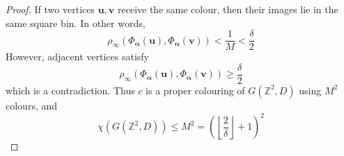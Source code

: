 \documentclass[10pt,a4paper]{amsart}
\newcommand{\Z}{\mathbb{Z}}
\newcommand{\floor}[1]{\left\lfloor#1\right\rfloor}
\begin{document}
\begin{proof}
If two vertices $\mathbf u,\mathbf v$ receive the same colour, then their images lie in the same square bin. In other words,
\[
\rho_\infty\!\left(
\Phi_{\boldsymbol\alpha}(\mathbf u),
\Phi_{\boldsymbol\alpha}(\mathbf v)
\right)
<
\frac1M
<
\frac{\delta}{2}
\]
However, adjacent vertices satisfy
\[
\rho_\infty\!\left(
\Phi_{\boldsymbol\alpha}(\mathbf u),
\Phi_{\boldsymbol\alpha}(\mathbf v)
\right)
\ge
\frac{\delta}{2}
\]
which is a contradiction.
Thus $c$ is a proper colouring of $G(\Z^2,D)$ using $M^2$ colours, and
\[
\chi(G(\Z^2,D))
\le
M^2
=
\left(\floor{\frac{2}{\delta}}+1\right)^2
\]
\end{proof}
\end{document}
